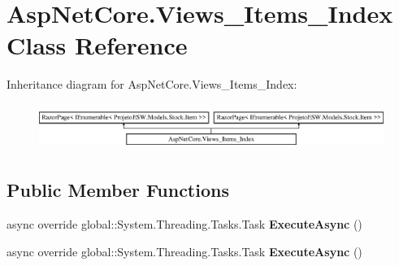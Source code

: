 \hypertarget{class_asp_net_core_1_1_views___items___index}{}\section{Asp\+Net\+Core.\+Views\+\_\+\+Items\+\_\+\+Index Class Reference}
\label{class_asp_net_core_1_1_views___items___index}
Inheritance diagram for Asp\+Net\+Core.\+Views\+\_\+\+Items\+\_\+\+Index\+:\begin{figure}[H]
\begin{center}
\leavevmode
\includegraphics[height=1.521739cm]{class_asp_net_core_1_1_views___items___index}
\end{center}
\end{figure}
\subsection*{Public Member Functions}
\begin{DoxyCompactItemize}
\item 
\mbox{\label{class_asp_net_core_1_1_views___items___index_ac7499db98f6c2aad37ce40a44a4755d3}} 
async override global\+::\+System.\+Threading.\+Tasks.\+Task {\bfseries Execute\+Async} ()
\item 
\mbox{\label{class_asp_net_core_1_1_views___items___index_ac7499db98f6c2aad37ce40a44a4755d3}} 
async override global\+::\+System.\+Threading.\+Tasks.\+Task {\bfseries Execute\+Async} ()
\end{DoxyCompactItemize}
